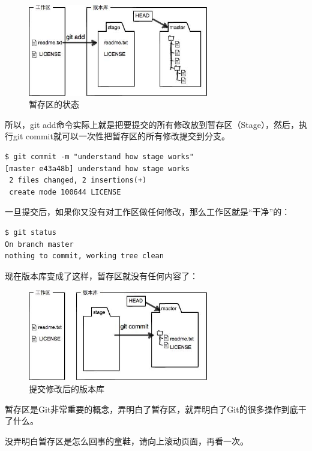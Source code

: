 \begin{figure}[h]
  \centering
  \includegraphics[width=0.7\textwidth]{img/git-stage.jpg}
  \caption{暂存区的状态}
  \label{fig:mesh1}
\end{figure}

所以，git add命令实际上就是把要提交的所有修改放到暂存区（Stage），然后，执行git commit就可以一次性把暂存区的所有修改提交到分支。

\begin{verbatim}
$ git commit -m "understand how stage works"
[master e43a48b] understand how stage works
 2 files changed, 2 insertions(+)
 create mode 100644 LICENSE
\end{verbatim}

一旦提交后，如果你又没有对工作区做任何修改，那么工作区就是“干净”的：

\begin{verbatim}
$ git status
On branch master
nothing to commit, working tree clean
\end{verbatim}

现在版本库变成了这样，暂存区就没有任何内容了：

\begin{figure}[h]
  \centering
  \includegraphics[width=0.7\textwidth]{img/git-stage-after-commit.jpg}
  \caption{提交修改后的版本库}
  \label{fig:mesh1}
\end{figure}

\begin{tcolorbox}
暂存区是Git非常重要的概念，弄明白了暂存区，就弄明白了Git的很多操作到底干了什么。

没弄明白暂存区是怎么回事的童鞋，请向上滚动页面，再看一次。
\end{tcolorbox}

